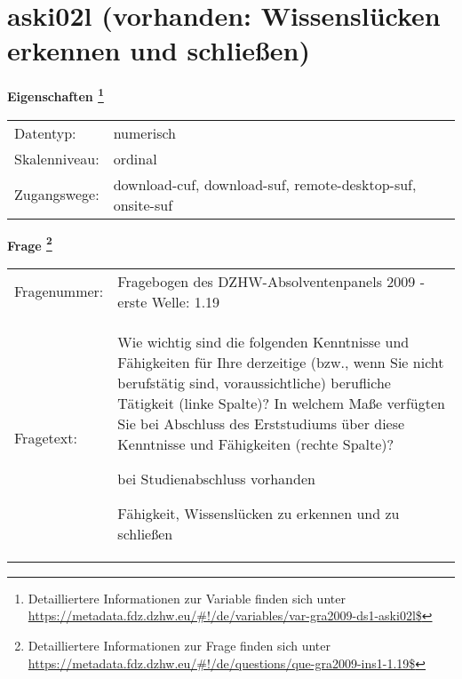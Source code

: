 
    \setcounter{footnote}{0}

    \vspace*{-1.8cm}
	\section{aski02l (vorhanden: Wissenslücken erkennen und schließen)}
	\label{section:aski02l}



    \vspace*{0.5cm}
    \noindent\textbf{Eigenschaften
	\footnote{Detailliertere Informationen zur Variable finden sich unter
		\url{https://metadata.fdz.dzhw.eu/\#!/de/variables/var-gra2009-ds1-aski02l$}}}\\
	\begin{tabularx}{\hsize}{@{}lX}
	Datentyp: & numerisch \\
	Skalenniveau: & ordinal \\
	Zugangswege: &
	  download-cuf, 
	  download-suf, 
	  remote-desktop-suf, 
	  onsite-suf
 \\
    \end{tabularx}



				\vspace*{0.5cm}
                \noindent\textbf{Frage
	                \footnote{Detailliertere Informationen zur Frage finden sich unter
		              \url{https://metadata.fdz.dzhw.eu/\#!/de/questions/que-gra2009-ins1-1.19$}}}\\
				\begin{tabularx}{\hsize}{@{}lX}
					Fragenummer: &
					  Fragebogen des DZHW-Absolventenpanels 2009 - erste Welle:
					  1.19
 \\
					Fragetext: & Wie wichtig sind die folgenden Kenntnisse und Fähigkeiten für Ihre derzeitige (bzw., wenn Sie nicht berufstätig sind, voraussichtliche) berufliche Tätigkeit (linke Spalte)? In welchem Maße verfügten Sie bei Abschluss des Erststudiums über diese Kenntnisse und Fähigkeiten (rechte Spalte)?\par  bei Studienabschluss vorhanden\par  Fähigkeit, Wissenslücken zu erkennen und zu schließen \\
				\end{tabularx}





